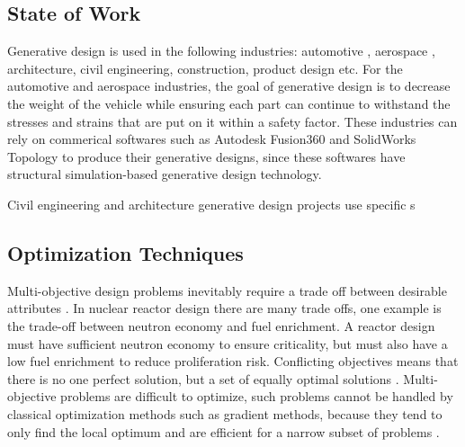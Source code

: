 
\subsection{State of Work}
Generative design is used in the following industries: 
automotive \cite{deplazes_autodesk_2019}, aerospace \cite{byrne_evolving_2014},
architecture, civil engineering, construction, product design etc. 
For the automotive and aerospace industries, the goal of generative 
design is to decrease 
the weight of the vehicle while ensuring each part can continue to 
withstand the stresses and strains that are put on it within a 
safety factor. 
These industries can rely on commerical softwares such as 
Autodesk Fusion360 \cite{autodesk_autodesk_2020} and  
SolidWorks Topology \cite{lombard_solidworks_2008}
to produce their generative designs, since these softwares have 
structural simulation-based generative design technology.  

Civil engineering and architecture generative design projects use specific s

\subsection{Optimization Techniques}
Multi-objective design problems inevitably require a trade off between 
desirable attributes \cite{byrne_evolving_2014,simon_sciences_2019}. 
In nuclear reactor design there are many trade offs, one example is the 
trade-off between neutron economy and fuel enrichment. 
A reactor design must have sufficient neutron economy to ensure criticality, 
but must also have a low fuel enrichment to reduce proliferation risk.
Conflicting objectives means that there is no one perfect solution, but a set
of equally optimal solutions \cite{byrne_evolving_2014}.
Multi-objective problems are difficult to optimize, such problems 
cannot be handled by classical optimization methods such as gradient 
methods, because they tend to only find the local optimum 
\cite{renner_genetic_2003} and are efficient for a narrow subset 
of problems \cite{zames_genetic_1981}. 

